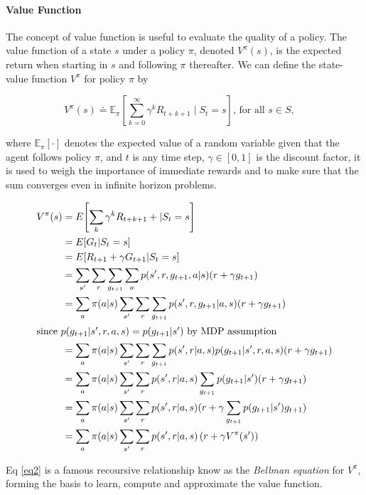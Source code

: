 \documentclass[a4paper,11pt]{report}
\theoremstyle{definition}
\theoremstyle{plain}
\theoremstyle{remark}  %
\begin{document}
\paragraph{Value Function} The concept of value function is useful to evaluate the 
quality of a policy. The value function of a state \(s\) under a policy \(\pi\), denoted \(V^{\pi}(s)\), 
is the expected return when starting in \(s\) and following \(\pi\) thereafter. 
We can define the state-value function  \(V^{\pi}\)  for policy \(\pi\) by

$$
V^{\pi}(s) \doteq 
\mathbb{E}_{\pi}\left[\sum_{k=0}^{\infty} \gamma^{k} R_{t+k+1} \mid S_{t}=s \right]
 \text {, for all } s \in S, \quad
$$

where \(\mathbb{E}_{\pi}[\cdot]\) denotes the expected value of a random variable given that the agent follows
policy \(\pi\), and \(t\) is any time step, $\gamma \in [0,1]$ is the discount factor, it is used 
to weigh the importance of immediate rewards and to make sure that the sum converges even in 
infinite horizon problems.

\begin{align}   
V^{\pi}(s)&=E{\left[\sum_{k} \gamma^k R_{t+k+1}+|S_t=s\right]} \nonumber \\
&=E{\left[G_t|S_t=s\right]} \nonumber \\
&=E{\left[R_{t+1}+\gamma G_{t+1}|S_t=s\right]} \nonumber \\
&= \sum_{s'}\sum_{r}\sum_{g_{t+1}}\sum_{a}p(s',r,g_{t+1}, a|s)(r+\gamma g_{t+1}) \nonumber \\
&= \sum_{a}\pi(a|s)\sum_{s'}\sum_{r}\sum_{g_{t+1}}p(s',r,g_{t+1} |a, s)(r+\gamma g_{t+1}) \nonumber \\
\intertext{since $p(g_{t+1}|s', r, a, s)=p(g_{t+1}|s')$ by MDP assumption}
&= \sum_{a}\pi(a|s)\sum_{s'}\sum_{r}\sum_{g_{t+1}}p(s',r|a, s)p(g_{t+1}|s', r, a, s)(r+\gamma g_{t+1}) \nonumber \\
&= \sum_{a}\pi(a|s)\sum_{s'}\sum_{r}p(s',r|a, s)\sum_{g_{t+1}}p(g_{t+1}|s')(r+\gamma g_{t+1}) \nonumber \\
&= \sum_{a}\pi(a|s)\sum_{s'}\sum_{r}p(s',r|a, s)(r+\gamma\sum_{g_{t+1}}p(g_{t+1}|s')g_{t+1}) \nonumber \\
&=\sum_{a}\pi(a|s)\sum_{s'}\sum_{r}p(s',r|a, s)\left(r+\gamma V^{\pi}(s')\right) \label{eq2}
\end{align}

Eq \ref{eq2} is a famous recoursive relationship know as the \textit{Bellman equation} for 
$V^{\pi}$, forming the basis to learn, compute and approximate the value function.
\end{document}
